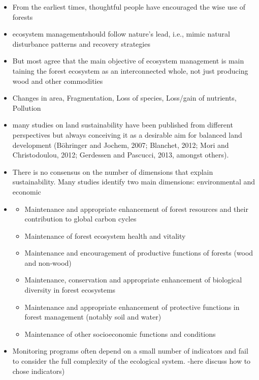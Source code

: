 \documentclass{article}
\begin{document}
\begin{itemize}
    \item From the earliest times, thoughtful people have encouraged the wise use of forests \cite{macdicken2015global}
    \item ecosystem managementshould follow nature's lead, i.e., mimic natural disturbance patterns and recovery strategies \cite{bengston_changing_1994}
    \item But most agree that the main objective of ecosystem management is main taining the forest ecosystem as an interconnected whole, not just producing wood and other commodities \cite{franklin1989toward}
    \item Changes in area, Fragmentation, Loss of species, Loss/gain of nutrients, Pollution \cite{n.e._criteria_1997}
    \item many studies on land sustainability have been published from different perspectives but always conceiving it as a desirable aim for balanced land development (Böhringer and Jochem, 2007; Blanchet, 2012; Mori and Christodoulou, 2012; Gerdessen and Pascucci, 2013, amongst others).
    \item There is no consensus on the number of dimensions that explain sustainability. Many studies identify two main dimensions: environmental and economic \cite{martinez-vega_assessing_2016}
    \item \cite{makela_using_2012}
    \begin{itemize}
        \item Maintenance and appropriate enhancement of forest resources and their contribution to global carbon cycles
        \item Maintenance of forest ecosystem health and vitality
        \item Maintenance and encouragement of productive functions of forests (wood and
non-wood)
        \item Maintenance, conservation and appropriate enhancement of biological diversity
in forest ecosystems
        \item Maintenance and appropriate enhancement of protective functions in forest
management (notably soil and water)
        \item Maintenance of other socioeconomic functions and conditions
    \end{itemize}
    \item Monitoring programs often depend on a small number of indicators and fail
to consider the full complexity of the ecological system. \cite{dale2001challenges} -here discuss how to chose indicators)

\end{itemize}
\end{document}
